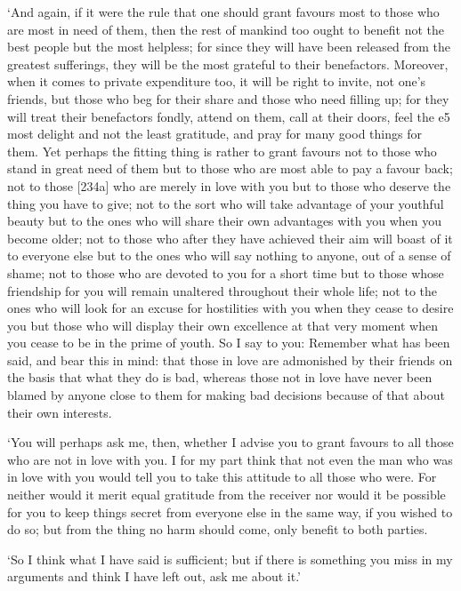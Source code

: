 ‘And again, if it were the rule that one should grant favours
most to those who are most in need of them, then the rest of mankind too
ought to benefit not the best people but the most helpless; for since
they will have been released from the greatest sufferings, they will be
the most grateful to their benefactors.  Moreover, when it comes
to private expenditure too, it will be right to invite, not one's
friends, but those who beg for their share and those who need filling
up; for they will treat their benefactors fondly, attend on them, call
at their doors, feel the e5 most delight and not the least gratitude,
and pray for many good things for them. Yet perhaps the fitting thing is
rather to grant favours not to those who stand in great need of them but
to those who are most able to pay a favour back; not to those {[}234a{]}
who are merely in love with you but to those who deserve the thing you
have to give; not to the sort who will take advantage of your youthful
beauty but to the ones who will share their own advantages with you when
you become older; not to those who after they have achieved their aim
will boast of it to  everyone else but to the ones who will say
nothing to anyone, out of a sense of shame; not to those who are devoted
to you for a short time but to those whose friendship for you will
remain unaltered throughout their whole life; not to the ones who will
look for an excuse for hostilities with you when they cease to desire
you but those who will display their own excellence at that very moment
when you cease to be in the  prime of youth. So I say to you:
Remember what has been said, and bear this in mind: that those in love
are admonished by their friends on the basis that what they do is bad,
whereas those not in love have never been blamed by anyone close to them
for making bad decisions because of that about their own 
interests.

‘You will perhaps ask me, then, whether I advise you to grant favours to
all those who are not in love with you. I for my part think that not
even the man who was in love with you would tell you to take this
attitude to all those who were. For neither  would it merit
equal gratitude from the receiver nor would it be possible for you to
keep things secret from everyone else in the same way, if you wished to
do so; but from the thing
no harm should come, only benefit to both parties.

‘So I think what I have said is sufficient; but if there is 
something you miss in my
arguments and think I have left out, ask me about it.'

